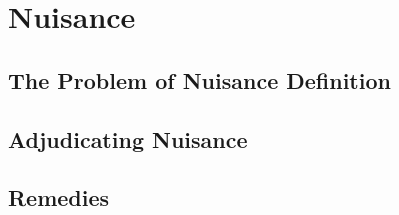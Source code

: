 \chapter{Nuisance}






\section{The Problem of Nuisance Definition} 







\begin{questions}


\end{questions}



\section{Adjudicating Nuisance} 






\begin{questions}

\end{questions}




\section{Remedies}



%
%
%





\begin{questions}

\end{questions}
\endinput

